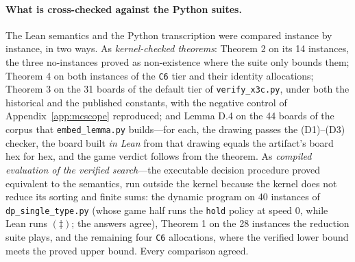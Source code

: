 \documentclass[11pt,a4paper]{article}
\theoremstyle{plain}
\theoremstyle{definition}
\theoremstyle{plain}
\theoremstyle{definition}
\theoremstyle{remark}
\newcommand{\src}[1]{\texttt{#1}}
\begin{document}
{\sloppy\paragraph{What is cross-checked against the Python suites.} The Lean semantics and the
Python transcription were compared instance by instance, in two ways. As
\emph{kernel-checked theorems}: Theorem 2 on its 14 instances, the three no-instances proved
as non-existence where the suite only bounds them; Theorem 4 on both instances of the
\src{C6} tier and their identity allocations; Theorem 3 on the 31 boards of the default tier
of \src{verify\_x3c.py}, under both the historical and the published constants, with the
negative control of Appendix~\ref{app:mcscope} reproduced; and Lemma D.4 on the 44 boards
of the corpus that \src{embed\_lemma.py} builds---for each, the drawing passes the
(D1)--(D3) checker, the board built \emph{in Lean} from that drawing equals the artifact's
board hex for hex, and the game verdict follows from the theorem. As \emph{compiled
evaluation of the verified search}---the executable decision procedure proved equivalent to
the semantics, run outside the kernel because the kernel does not reduce its sorting and
finite sums: the dynamic program on 40 instances of \src{dp\_single\_type.py} (whose game
half runs the \src{hold} policy at speed 0, while Lean runs $(\ddagger)$; the answers agree),
Theorem 1 on the 28 instances the reduction suite plays, and the remaining four \src{C6}
allocations, where the verified lower bound meets the proved upper bound. Every comparison
agreed.\par}
\end{document}
